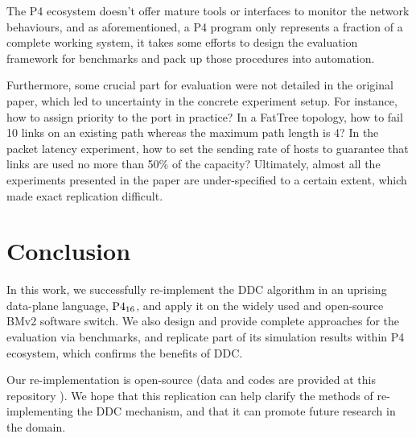 The P4 ecosystem doesn't offer mature tools or interfaces to monitor the network behaviours, and as aforementioned, a P4 program only represents a fraction of a complete working system, it takes some efforts to design the evaluation framework for benchmarks and pack up those procedures into automation. 

Furthermore, some crucial part for evaluation were not detailed in the original paper, which led to uncertainty in the concrete experiment setup. 
For instance, how to assign priority to the port in practice? In a FatTree topology, how to fail 10 links on an existing path whereas the maximum path length is 4? In the packet latency experiment, how to set the sending rate of hosts to guarantee that links are used no more than 50\% of the capacity? Ultimately, almost all the experiments presented in the paper are under-specified to a certain extent, which made exact replication difficult.


\section{Conclusion}
In this work, we successfully re-implement the DDC algorithm in an uprising data-plane language, $\rm P4_{16}$, and apply it on the widely used and open-source BMv2 software switch. 
We also design and provide complete approaches for the evaluation via benchmarks, and replicate part of its simulation results within P4 ecosystem, which confirms the benefits of DDC. 

Our re-implementation is open-source (data and codes are provided at this repository \cite{repo}). 
We hope that this replication can help clarify the methods of re-implementing the DDC mechanism, and that it can promote future research in the domain.